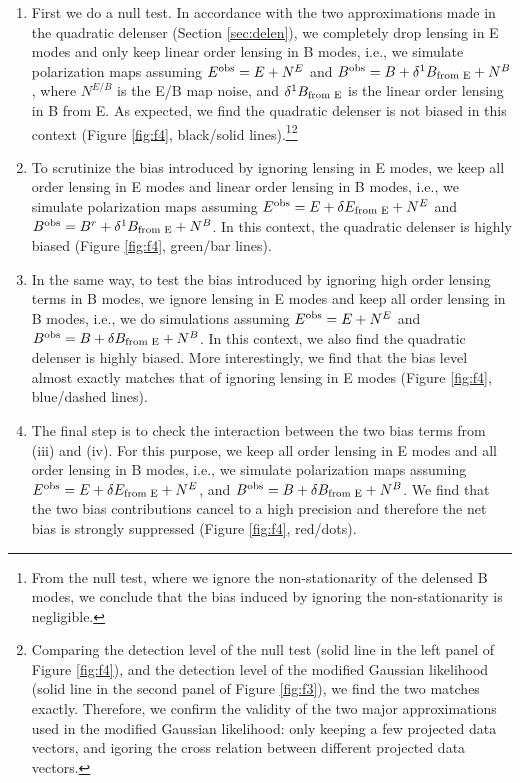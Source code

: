 \documentclass[aps, prd, reprint, nofootinbib, groupedaddress, showpacs]{revtex4-1}
\begin{document}
\begin{enumerate}[label=(\roman*)]
    \item First we do a null test.
In accordance with the two approximations made in the quadratic delenser (Section \ref{sec:delen}),
we completely drop lensing in E modes and only keep linear order lensing in B modes, i.e.,
we simulate polarization maps assuming $E^{\rm obs} = E + N^E$
and $B^{\rm obs} = B + \delta^1B_{\text{\rm from E}} + N^B$, where
$N^{E/B}$ is the E/B map noise, and  $\delta^1B_{\text{\rm from E}}$ is the linear order lensing in B from E.
As expected, we find the quadratic delenser is not biased in this context
(Figure \ref{fig:f4}, black/solid lines).\footnote{From the null test,
where we ignore the non-stationarity of the delensed B modes,
we conclude that the bias induced by ignoring  the non-stationarity
is negligible.}\footnote{Comparing the detection level of the null test (solid line in the left panel of Figure \ref{fig:f4}),
and the detection level of the modified Gaussian likelihood (solid line in the second panel of Figure \ref{fig:f3}),
we find the two matches exactly. Therefore, we confirm the validity of
the two major approximations used in the modified Gaussian likelihood:
only keeping a few projected data vectors,
and igoring the cross relation between different projected data vectors.}

    \item To scrutinize the bias introduced by ignoring lensing in E modes,
we keep all order lensing in E modes and linear order lensing in B modes,
i.e., we simulate polarization maps assuming
$E^{\rm obs} = E +  \delta E_{\text{\rm from E}} + N^E$
and $B^{\rm obs} = B^r + \delta^1B_{\text{\rm from E}} + N^B$.
In this context, the quadratic delenser is highly biased (Figure \ref{fig:f4}, green/bar lines).

    \item In the same way, to test the bias introduced by ignoring high order lensing terms in B modes,
we ignore lensing in E modes and keep all order lensing in B modes, i.e.,
we do simulations assuming $E^{\rm obs} = E  + N^E$
and $B^{\rm obs} = B + \delta B_{\text{\rm from E}} + N^B$.
In this context, we also find the quadratic delenser is highly biased.
More interestingly, we find that the bias level almost exactly matches that of ignoring lensing in E modes
(Figure \ref{fig:f4}, blue/dashed lines).

    \item The final step is to check the interaction between the two bias terms from (iii) and (iv).
For this purpose, we keep all order lensing in E modes and all order lensing in B modes,
i.e., we simulate polarization maps assuming $E^{\rm obs} = E + \delta E_{\text{\rm from E}} + N^E$,
and $B^{\rm obs} = B +  \delta B_{\text{\rm from E}} + N^B$.
We find that the two bias contributions cancel to a high precision
and therefore the net bias is strongly suppressed (Figure \ref{fig:f4}, red/dots).


\end{enumerate}
\end{document}

